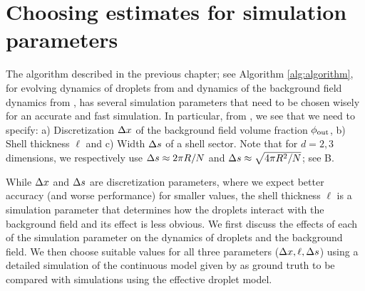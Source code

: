\onehalfspacing

\chapter{Choosing estimates for simulation parameters}

\label{chap:Chapter_4}

The algorithm described in the previous chapter; see Algorithm \ref{alg:algorithm}, for evolving dynamics of droplets from  and dynamics of the background field dynamics from , has several simulation parameters that need to be chosen wisely for an accurate and fast simulation.
In particular, from , we see that we need to specify: a) Discretization $\Delta x$ of the background field volume fraction $\phi_\mathrm{out}$, b) Shell thickness $\ell$ and c) Width $\Delta s$ of a shell sector.
Note that for $d=2,3$ dimensions, we respectively use $\Delta s \approx 2\pi R/N$ and $\Delta s \approx\sqrt{4 \pi R^2 / N}$; see B.

While $\Delta x$ and $\Delta s$ are discretization parameters, where we expect better accuracy (and worse performance) for smaller values, the shell thickness $\ell$ is a simulation parameter that determines how the droplets interact with the background field and its effect is less obvious.
We first discuss the effects of each of the simulation parameter on the dynamics of droplets and the background field. 
We then choose suitable values for all three parameters ($\Delta x, \ell, \Delta s$) using a detailed simulation of the continuous model given by  as ground truth to be compared with simulations using the effective droplet model.

